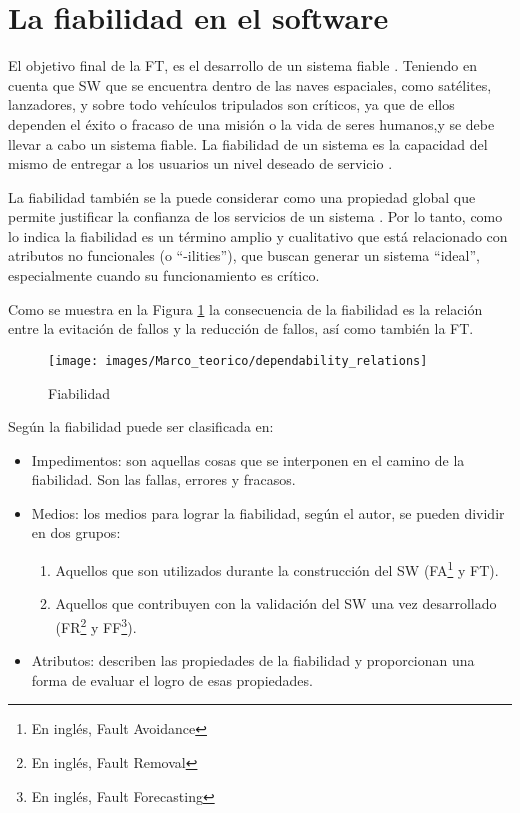 \section{La fiabilidad en el software}\label{sec:fiabilidad_software}
El objetivo final de la \ac{FT}, es el desarrollo de un sistema fiable \citep{FTDesign}. Teniendo
en cuenta que \ac{SW} que se encuentra dentro de las naves espaciales, como satélites,
lanzadores, y sobre todo vehículos tripulados son críticos, ya que de ellos dependen el éxito o
fracaso de una misión o la vida de seres humanos,y se debe llevar a cabo un sistema fiable.
La fiabilidad de un sistema es la capacidad del mismo de entregar a los usuarios un nivel
deseado de servicio \citep{FTDesign}.

La fiabilidad también se la puede considerar como una propiedad global que permite justificar la
confianza de los servicios de un sistema \citep{FTAvionics}. Por lo tanto, como lo indica
\cite{FTAvionics} la fiabilidad es un término amplio y cualitativo que está relacionado con
atributos no funcionales (o ``-ilities''), que buscan generar un sistema ``ideal'', especialmente
cuando su funcionamiento es crítico.

Como se muestra en la Figura \ref{fig:dependability_relations} la consecuencia de la fiabilidad es
la relación entre la evitación de fallos y la reducción de fallos, así como también la \ac{FT}.

\begin{figure}[h]
 \centering
 \texttt{[image: images/Marco\_teorico/dependability\_relations]}
  \caption{Fiabilidad \protect\citep{FTAvionics}}
\label{fig:dependability_relations}
\end{figure}

Según \cite{Pullum01} la fiabilidad puede ser clasificada en:
\begin{itemize}
 \item Impedimentos: son aquellas cosas que se interponen en el camino de la fiabilidad. Son las
fallas, errores y fracasos.
 \item Medios: los medios para lograr la fiabilidad, según el autor, se pueden dividir en dos
grupos:
  \begin{enumerate}
    \item Aquellos que son utilizados durante la construcción del \ac{SW} (\ac{FA}\footnote{En
    inglés, Fault Avoidance} y \ac{FT}).
    \item Aquellos que contribuyen con la validación del \ac{SW} una vez desarrollado
    (\ac{FR}\footnote{En inglés, Fault Removal} y \ac{FF}\footnote{En inglés, Fault Forecasting}).
  \end{enumerate}

 \item Atributos: describen las propiedades de la fiabilidad y proporcionan una forma de evaluar el
logro de esas propiedades.
\end{itemize}

